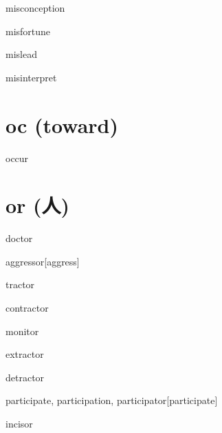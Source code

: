 \begin{RefWord}{misconception}
\end{RefWord}

\begin{RefWord}{misfortune}
\end{RefWord}

\begin{RefWord}{mislead}
\end{RefWord}

\begin{RefWord}{misinterpret}
\end{RefWord}

\section{oc (toward)}

\begin{RefWord}{occur}
\end{RefWord}

\section{or (人)}


\begin{RefWord}{doctor}
\end{RefWord}

\begin{RefWord}{aggressor}[aggress]
\end{RefWord}

\begin{RefWord}{tractor}
\end{RefWord}

\begin{RefWord}{contractor}
\end{RefWord}

\begin{RefWord}{monitor}
\end{RefWord}

\begin{RefWord}{extractor}
\end{RefWord}

\begin{RefWord}{detractor}
\end{RefWord}

\begin{RefWord}{participate, participation, participator}[participate]
\end{RefWord}

\begin{RefWord}{incisor}
\end{RefWord}


